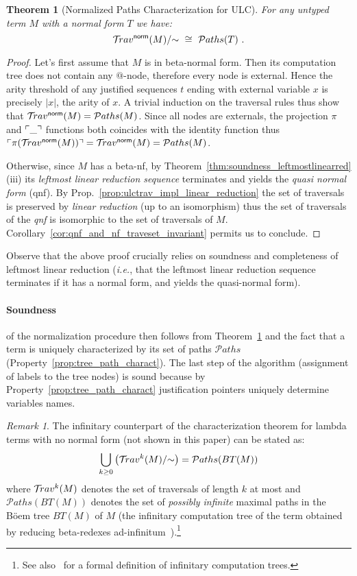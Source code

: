 \documentclass{article}
\makeatletter
\theoremstyle{plain}
\newtheorem{theorem}{Theorem}[section]
\theoremstyle{definition}
\theoremstyle{remark}
\newtheorem{remark}{Remark}[section]
\newcommand{\normalizing}{{\sf norm}}
\newcommand{\travsetnorm}{\travset^\normalizing}
\newcommand{\travulc}{\travset}
\def\coresymbol{\pi} %
\newcommand{\core}[1]{\coresymbol(#1)} %
\newcommand\pathset{{\mathcal{P}aths}} %
\renewcommand\ie{{\it i.e.\@\xspace}}
\makeatother
\begin{document}
\begin{theorem}[Normalized Paths Characterization for ULC]
\label{thm:path_charact_ulc}
For any untyped term $M$ with a normal form $T$ we have:
$$\travsetnorm(M)/{\sim} \ \cong\ \pathset(T) \ .$$
\end{theorem}
\begin{proof}
Let's first assume that $M$ is in beta-normal form. Then its computation tree does not contain any $@$-node, therefore every node is external.
Hence the arity threshold of any justified sequences $t$ ending with external variable $x$ is precisely $|x|$, the arity of $x$. A trivial induction on the traversal rules thus show that $\travsetnorm(M) = \pathset(M)$. Since all nodes are externals, the projection $\coresymbol$ and $\ulcorner \_ \urcorner$ functions both coincides with the identity function thus $\pview{\core{\travsetnorm(M)}} = \travsetnorm(M) = \pathset(M)$.

Otherwise, since $M$ has a beta-nf, by Theorem~\ref{thm:soundness_leftmostlinearred}(iii) its \emph{leftmost linear reduction sequence} terminates and yields the \emph{quasi normal form} (qnf). By Prop.~\ref{prop:ulctrav_impl_linear_reduction} the set of traversals is preserved by \emph{linear reduction} (up to an isomorphism) thus the set of traversals of the \emph{qnf} is isomorphic to the set of traversals of $M$.  Corollary~\ref{cor:qnf_and_nf_traveset_invariant} permits us to conclude.
\end{proof}

\begin{remarkbox}Observe that the above proof crucially relies on soundness and completeness of leftmost linear reduction (\ie, that the leftmost linear reduction sequence terminates if it has a normal form, and yields the quasi-normal form).
\end{remarkbox}

\paragraph{Soundness} of the normalization procedure then follows from Theorem~\ref{thm:path_charact_ulc} and the fact that a term is uniquely characterized by its set of paths $\pathset$ (Property~\ref{prop:tree_path_charact}). The last step of the algorithm (assignment of labels to the tree nodes) is sound because by Property~\ref{prop:tree_path_charact} justification pointers uniquely determine variables names.

\begin{remark}
The infinitary counterpart of the characterization theorem for lambda terms with no normal form (not shown in this paper) can be stated as:
$$ \Union_{k\geq0} \left(\travulc^k(M)/{\sim}\right) = \pathset(BT(M))$$
where $\travulc^k(M)$ denotes the set of traversals of length $k$ at most and $\pathset(BT(M))$ denotes the set of \emph{possibly infinite} maximal paths in the B\"oem tree $BT(M)$ of $M$ (the infinitary computation tree of the term obtained by reducing beta-redexes ad-infinitum~\cite{barendregt2013lambda}).\footnote{See also~\cite{Blum17-HomogNotRestriction, Ong2006} for a formal definition of infinitary computation trees.}
\end{remark}
\end{document}
